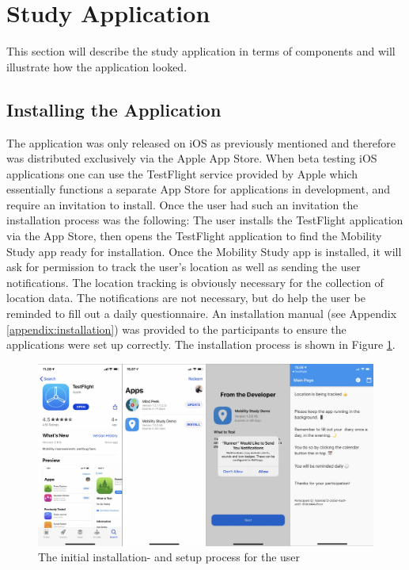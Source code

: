 \section{Study Application}
This section will describe the study application in terms of components and will illustrate how the application looked.

\subsection{Installing the Application}
The application was only released on iOS as previously mentioned and therefore was distributed exclusively via the Apple App Store. When beta testing iOS applications one can use the TestFlight service provided by Apple which essentially functions a separate App Store for applications in development, and require an invitation to install. Once the user had such an invitation the installation process was the following: The user installs the TestFlight application via the App Store, then opens the TestFlight application to find the Mobility Study app ready for installation. Once the Mobility Study app is installed, it will ask for permission to track the user's location as well as sending the user notifications. The location tracking is obviously necessary for the collection of location data. The notifications are not necessary, but do help the user be reminded to fill out a daily questionnaire. An installation manual (see Appendix \ref{appendix:installation}) was provided to the participants to ensure the applications were set up correctly. The installation process is shown in Figure \ref{fig:screens-install}.

\begin{figure}
    \centering
    \includegraphics[width=\textwidth]{images/app_imgs/screens-install.pdf}
    \caption{The initial installation- and setup process for the user}
    \label{fig:screens-install}
\end{figure}


